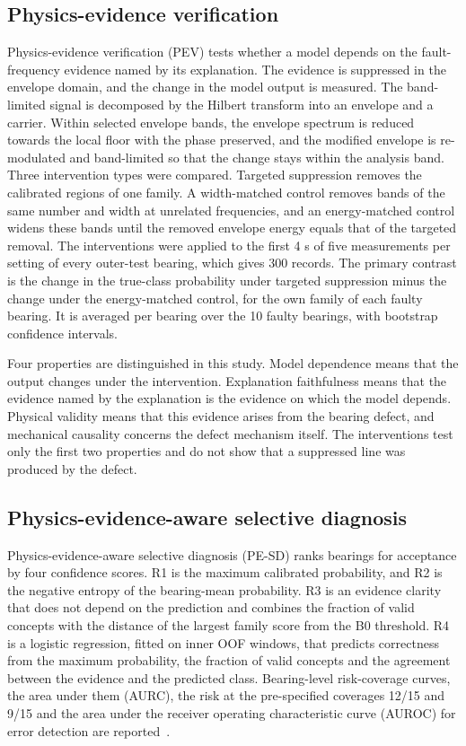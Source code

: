 \documentclass[10pt,letterpaper]{article}
\begin{document}
\subsection*{Physics-evidence verification}
Physics-evidence verification (PEV) tests whether a model depends on the fault-frequency evidence named by its explanation. The evidence is suppressed in the envelope domain, and the change in the model output is measured. The band-limited signal is decomposed by the Hilbert transform into an envelope and a carrier. Within selected envelope bands, the envelope spectrum is reduced towards the local floor with the phase preserved, and the modified envelope is re-modulated and band-limited so that the change stays within the analysis band. Three intervention types were compared. Targeted suppression removes the calibrated regions of one family. A width-matched control removes bands of the same number and width at unrelated frequencies, and an energy-matched control widens these bands until the removed envelope energy equals that of the targeted removal. The interventions were applied to the first 4 s of five measurements per setting of every outer-test bearing, which gives 300 records. The primary contrast is the change in the true-class probability under targeted suppression minus the change under the energy-matched control, for the own family of each faulty bearing. It is averaged per bearing over the 10 faulty bearings, with bootstrap confidence intervals.

Four properties are distinguished in this study. Model dependence means that the output changes under the intervention. Explanation faithfulness means that the evidence named by the explanation is the evidence on which the model depends. Physical validity means that this evidence arises from the bearing defect, and mechanical causality concerns the defect mechanism itself. The interventions test only the first two properties and do not show that a suppressed line was produced by the defect.

\subsection*{Physics-evidence-aware selective diagnosis}
Physics-evidence-aware selective diagnosis (PE-SD) ranks bearings for acceptance by four confidence scores. R1 is the maximum calibrated probability, and R2 is the negative entropy of the bearing-mean probability. R3 is an evidence clarity that does not depend on the prediction and combines the fraction of valid concepts with the distance of the largest family score from the B0 threshold. R4 is a logistic regression, fitted on inner OOF windows, that predicts correctness from the maximum probability, the fraction of valid concepts and the agreement between the evidence and the predicted class. Bearing-level risk-coverage curves, the area under them (AURC), the risk at the pre-specified coverages 12/15 and 9/15 and the area under the receiver operating characteristic curve (AUROC) for error detection are reported~\cite{geifman2017selective}.
\end{document}

